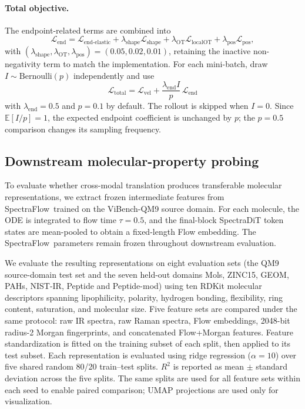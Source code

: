 \documentclass[pdflatex,sn-mathphys-num]{sn-jnl}%
\newcommand{\mname}{SpectraFlow}
\theoremstyle{thmstyleone}%
\theoremstyle{thmstyletwo}%
\theoremstyle{thmstylethree}%
\begin{document}
\paragraph{Total objective.}
The endpoint-related terms are combined into
\[
\mathcal{L}_{\mathrm{end}}
=
\mathcal{L}_{\mathrm{end\text{-}elastic}}
+
\lambda_{\mathrm{shape}}\mathcal{L}_{\mathrm{shape}}
+
\lambda_{\mathrm{OT}}\mathcal{L}_{\mathrm{localOT}}
+
\lambda_{\mathrm{pos}}\mathcal{L}_{\mathrm{pos}} ,
\]
with $(\lambda_{\mathrm{shape}},\lambda_{\mathrm{OT}},\lambda_{\mathrm{pos}})=(0.05,0.02,0.01)$, retaining the inactive non-negativity term to match the implementation. For each mini-batch, draw $I\sim\mathrm{Bernoulli}(p)$ independently and use
\[
\mathcal{L}_{\mathrm{total}}
=
\mathcal{L}_{\mathrm{vel}}
+
\frac{\lambda_{\mathrm{end}} I}{p}\,
\mathcal{L}_{\mathrm{end}}
\]
with $\lambda_{\mathrm{end}}=0.5$ and $p=0.1$ by default. The rollout is skipped when $I=0$. Since $\mathbb{E}[I/p]=1$, the expected endpoint coefficient is unchanged by $p$; the $p=0.5$ comparison changes its sampling frequency.

\subsection*{Downstream molecular-property probing}

To evaluate whether cross-modal translation produces transferable molecular representations, we extract frozen intermediate features from \mname\ trained on the ViBench-QM9 source domain. For each molecule, the ODE is integrated to flow time $\tau=0.5$, and the final-block SpectraDiT token states are mean-pooled to obtain a fixed-length Flow embedding. The \mname\ parameters remain frozen throughout downstream evaluation.

We evaluate the resulting representations on eight evaluation sets (the QM9 source-domain test set and the seven held-out domains Mols, ZINC15, GEOM, PAHs, NIST-IR, Peptide and Peptide-mod) using ten RDKit molecular descriptors spanning lipophilicity, polarity, hydrogen bonding, flexibility, ring content, saturation, and molecular size. Five feature sets are compared under the same protocol: raw IR spectra, raw Raman spectra, Flow embeddings, 2048-bit radius-2 Morgan fingerprints, and concatenated Flow+Morgan features. Feature standardization is fitted on the training subset of each split, then applied to its test subset. Each representation is evaluated using ridge regression ($\alpha=10$) over five shared random 80/20 train--test splits. $R^2$ is reported as mean $\pm$ standard deviation across the five splits. The same splits are used for all feature sets within each seed to enable paired comparison; UMAP projections are used only for visualization.
\end{document}
